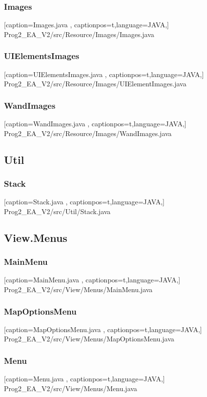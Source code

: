 \documentclass[a4paper,12pt]{scrartcl}
\begin{document}
	\subsubsection{Images}
	
	[caption={Images.java}
	\label{lst:javaclass},
	captionpos=t,language=JAVA,]
	{Prog2_EA_V2/src/Resource/Images/Images.java}
	\subsubsection{UIElementsImages}
	
	[caption={UIElementsImages.java}
	\label{lst:javaclass},
	captionpos=t,language=JAVA,]
	{Prog2_EA_V2/src/Resource/Images/UIElementImages.java}
	\subsubsection{WandImages}
	
	[caption={WandImages.java}
	\label{lst:javaclass},
	captionpos=t,language=JAVA,]
	{Prog2_EA_V2/src/Resource/Images/WandImages.java}
	\subsection{Util}
	\subsubsection{Stack}
	
	[caption={Stack.java}
	\label{lst:javaclass},
	captionpos=t,language=JAVA,]
	{Prog2_EA_V2/src/Util/Stack.java}
	\subsection{View.Menus}
	\subsubsection{MainMenu}
	
	[caption={MainMenu.java}
	\label{lst:javaclass},
	captionpos=t,language=JAVA,]
	{Prog2_EA_V2/src/View/Menus/MainMenu.java}
	\subsubsection{MapOptionsMenu}
	
	[caption={MapOptionsMenu.java}
	\label{lst:javaclass},
	captionpos=t,language=JAVA,]
	{Prog2_EA_V2/src/View/Menus/MapOptionsMenu.java}
	\subsubsection{Menu}
	
	[caption={Menu.java}
	\label{lst:javaclass},
	captionpos=t,language=JAVA,]
	{Prog2_EA_V2/src/View/Menus/Menu.java}
\end{document}
